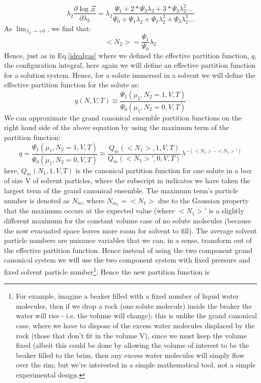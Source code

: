 \begin{equation}\label{}
  \lambda_{2}  \frac{\partial\log \Xi}{\partial \lambda_{2}} = \lambda_{2} \frac{\Psi_1 + 2* \Psi_2 \lambda_{2} +3*\Psi_3 \lambda_{2}^2 \dots  }{\Psi_0 + \Psi_1 \lambda_{2} +  \Psi_2 \lambda_{2}^2 +\Psi_3 \lambda_{2}^3 \dots }
\end{equation}
As $\lim_{\lambda_{2} \to +0}$, we find that:
\begin{equation}\label{averageN}
  < N_2 > = \frac{ \Psi_1}{\Psi_0} \lambda_2
\end{equation}
Hence, just as in Eq.\ref{idealgas} where we defined the effective partition function, $q$, the configuration integral, here again we will define an effective partition function for a solution system.  Hence, for a solute immersed in a solvent we will define the effective partition function for the solute as:
\begin{equation}\label{qref}
  q(N,V,T) \equiv \frac{ \Psi_1(\mu_1,N_2=1,V,T) }{\Psi_0(\mu_1,N_2=0,V,T)}
\end{equation}
We can approximate the grand canonical ensemble partition functions on the right hand side of the above equation by using the maximum term of the partition function:
\begin{equation}\label{solvent}
  q= \frac{ \Psi_1(\mu_1,N_2=1,V,T) }{\Psi_0(\mu_1,N_2=0,V,T)} \approx \frac{Q_m(<N_1>,1,V,T)}{Q_m(<N_1>',0,V,T)}\lambda^{-(<N_1> - <N_1>')}
\end{equation}
here, $Q_m(N_1,1,V,T)$ is the canonical partition function for one solute in a box of size V of solvent particles, where the subscript m indicates we have taken the largest term of the grand canonical ensemble.  The maximum term's particle number is denoted as $N_{m}$, where $N_{m_1}=<N_1>$ due to the Gaussian property that the maximum occurs at the expected value (where $<N_1>'$ is a slightly different maximum for the constant volume case of no solute molecules (because the now evacuated space leaves more room for solvent to fill).  The average solvent particle numbers are nuisance variables that we can, in a sense, transform out of the effective partition function.  Hence instead of using the two component grand canonical system we will use the two component system with fixed pressure and fixed solvent particle number\footnote{For example, imagine a beaker filled with a fixed number of liquid water molecules, then if we drop a rock (one solute molecule) inside the beaker the water will rise - i.e. the volume will change); this is unlike the grand canonical case, where we have to dispose of the excess water molecules displaced by the rock (those that don't fit in the volume V), since we must keep the volume fixed (albeit this could be done by allowing the volume of interest to be the beaker filled to the brim, then any excess water molecules will simply flow over the rim; but we're interested in a simple mathematical tool, not a simple experimental design.}.  Hence the new partition function is  
